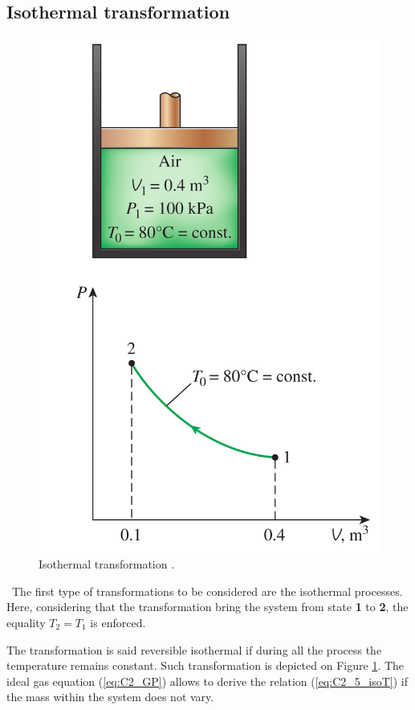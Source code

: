 \subsection{Isothermal transformation}
\begin{figure}
  \centering
  \includegraphics{isoT.png}
  \caption{Isothermal transformation \cite{2015}.}
  \label{fig:C2_5_isoT}
  \end{figure}
\quad\ The first type of transformations to be considered are the isothermal processes. Here, considering that the transformation bring the system from state \textbf{1} to \textbf{2}, the equality \(T_2 = T_1\)  is enforced. 

The transformation is said reversible isothermal if during all the process the temperature remains constant. Such transformation is depicted on Figure \ref{fig:C2_5_isoT}. The ideal gas equation (\ref{eq:C2_GP}) allows to derive the relation (\ref{eq:C2_5_isoT}) if the mass within the system does not vary.

